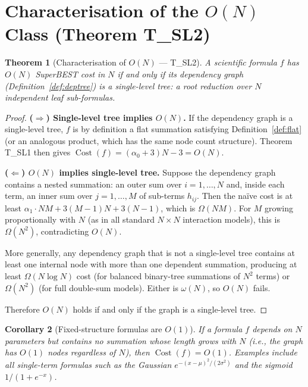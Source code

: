 \documentclass[12pt,a4paper]{article}
\newtheorem{theorem}{Theorem}[section]
\newtheorem{corollary}[theorem]{Corollary}
\theoremstyle{definition}
\newcommand{\Cost}{\operatorname{Cost}}
\begin{document}
\section{Characterisation of the $O(N)$ Class (Theorem T\_SL2)}
\label{sec:charN}

\begin{theorem}[Characterisation of $O(N)$ --- T\_SL2]
\label{thm:TSL2}
A scientific formula $f$ has $O(N)$ SuperBEST cost in $N$ if and only if its
dependency graph (Definition~\ref{def:deptree}) is a single-level tree:
a root reduction over $N$ independent leaf sub-formulas.
\end{theorem}

\begin{proof}
\textbf{($\Rightarrow$) Single-level tree implies $O(N)$.}
If the dependency graph is a single-level tree, $f$ is by definition a flat
summation satisfying Definition~\ref{def:flat} (or an analogous product,
which has the same node count structure).  Theorem T\_SL1 then gives
$\Cost(f) = (\alpha_0 + 3)N - 3 = O(N)$.

\medskip
\noindent\textbf{($\Leftarrow$) $O(N)$ implies single-level tree.}
Suppose the dependency graph contains a nested summation: an outer sum over
$i = 1, \ldots, N$ and, inside each term, an inner sum over $j = 1, \ldots, M$
of sub-terms $h_{ij}$.  Then the na\"{i}ve cost is at least
$\alpha_1 \cdot NM + 3(M-1)N + 3(N-1)$, which is $\Omega(NM)$.  For $M$
growing proportionally with $N$ (as in all standard $N \times N$ interaction
models), this is $\Omega(N^2)$, contradicting $O(N)$.

More generally, any dependency graph that is not a single-level tree contains
at least one internal node with more than one dependent summation, producing
at least $\Omega(N \log N)$ cost (for balanced binary-tree summations of
$N^2$ terms) or $\Omega(N^2)$ (for full double-sum models).  Either is
$\omega(N)$, so $O(N)$ fails.

\medskip
\noindent Therefore $O(N)$ holds if and only if the graph is a single-level
tree. \qedhere
\end{proof}

\begin{corollary}[Fixed-structure formulas are $O(1)$]
\label{cor:O1}
If a formula $f$ depends on $N$ parameters but contains no summation whose
length grows with $N$ (i.e., the graph has $O(1)$ nodes regardless of $N$),
then $\Cost(f) = O(1)$.  Examples include all single-term formulas such as
the Gaussian $e^{-(x-\mu)^2/(2\sigma^2)}$ and the sigmoid $1/(1+e^{-x})$.
\end{corollary}
\end{document}
